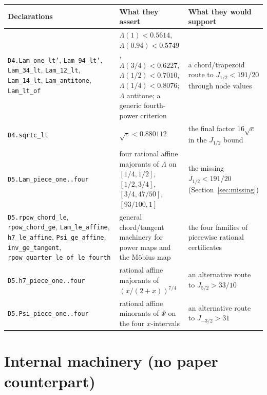 \documentclass[11pt]{article}
\newcommand{\Ln}[1]{\texttt{#1}}
\begin{document}
{\footnotesize
\begin{longtable}{L{4.2cm}L{6.0cm}L{5.6cm}}
\toprule
Declarations & What they assert & What they would support\\
\midrule\endhead
\Ln{D4.Lam\_\allowbreak{}one\_\allowbreak{}lt'}, \Ln{Lam\_\allowbreak{}94\_\allowbreak{}lt'}, \Ln{Lam\_\allowbreak{}34\_\allowbreak{}lt}, \Ln{Lam\_\allowbreak{}12\_\allowbreak{}lt},
\Ln{Lam\_\allowbreak{}14\_\allowbreak{}lt}, \Ln{Lam\_\allowbreak{}antitone}, \Ln{Lam\_\allowbreak{}lt\_\allowbreak{}of} & $\Lambda(1)<0.5614$,
$\Lambda(0.94)<0.5749$, $\Lambda(3/4)<0.6227$, $\Lambda(1/2)<0.7010$, $\Lambda(1/4)<0.8076$;
$\Lambda$ antitone; a generic fourth-power criterion & a chord/trapezoid route to
$J_{1/2}<191/20$ through node values\\
\Ln{D4.sqrtc\_\allowbreak{}lt} & $\sqrt c<0.880112$ & the final factor $16\sqrt c$ in the $J_{1/2}$ bound\\
\Ln{D5.Lam\_\allowbreak{}piece\_\allowbreak{}one..four} & four rational affine majorants of $\Lambda$ on $[1/4,1/2]$,
$[1/2,3/4]$, $[3/4,47/50]$, $[93/100,1]$ & the missing $J_{1/2}<191/20$ (Section~\ref{sec:missing})\\
\Ln{D5.rpow\_\allowbreak{}chord\_\allowbreak{}le}, \Ln{rpow\_\allowbreak{}chord\_\allowbreak{}ge}, \Ln{Lam\_\allowbreak{}le\_\allowbreak{}affine}, \Ln{h7\_\allowbreak{}le\_\allowbreak{}affine},
\Ln{Psi\_\allowbreak{}ge\_\allowbreak{}affine}, \Ln{inv\_\allowbreak{}ge\_\allowbreak{}tangent}, \Ln{rpow\_\allowbreak{}quarter\_\allowbreak{}le\_\allowbreak{}of\_\allowbreak{}le\_\allowbreak{}fourth} &
general chord/tangent machinery for power maps and the M\"obius map & the four families of
piecewise rational certificates\\
\Ln{D5.h7\_\allowbreak{}piece\_\allowbreak{}one..four} & rational affine majorants of $(x/(2+x))^{7/4}$ & an alternative
route to $J_{5/2}>33/10$\\
\Ln{D5.Psi\_\allowbreak{}piece\_\allowbreak{}one..four} & rational affine minorants of $\Psi$ on the four $x$-intervals &
an alternative route to $J_{-3/2}>31$\\
\bottomrule
\end{longtable}
}

\section{Internal machinery (no paper counterpart)}
\end{document}
